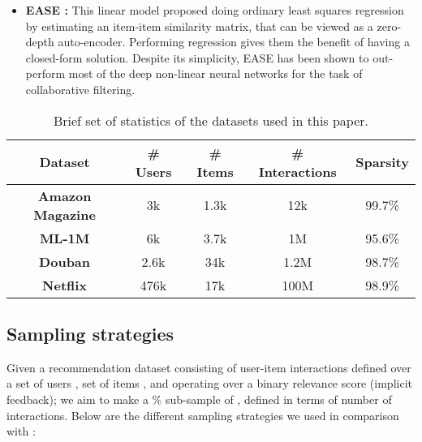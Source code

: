 \documentclass{article}
\begin{document}
\begin{itemize}[leftmargin=.3in]
    \item \textbf{EASE \cite{ease}:} This linear model proposed doing ordinary least squares regression by estimating an item-item similarity matrix, that can be viewed as a zero-depth auto-encoder. Performing regression gives them the benefit of having a closed-form solution. Despite its simplicity, EASE has been shown to out-perform most of the deep non-linear neural networks for the task of collaborative filtering.
\end{itemize}

\begin{table*}\begin{small} \caption{Brief set of statistics of the datasets used in this paper.}
    \label{data_stats}
    \begin{center}
        \begin{tabular}{c | c c c c}
            \toprule
            Dataset & \# Users & \# Items & \# Interactions & Sparsity \\
            
            \midrule
            
\textbf{Amazon Magazine \cite{amz_data}}            & 3k & 1.3k & 12k & 99.7\% \\
            \textbf{ML-1M \cite{movielens}}                      & 6k & 3.7k & 1M & 95.6\% \\
            \textbf{Douban \cite{douban_data}}                     & 2.6k & 34k & 1.2M & 98.7\% \\
\textbf{Netflix \cite{netflix_data}}                    & 476k & 17k & 100M & 98.9\% \\
            
            \bottomrule
        \end{tabular}
    \end{center}
    \end{small}
\end{table*} 
\subsection{Sampling strategies} \label{appendix:samplers}

Given a recommendation dataset  consisting of  user-item interactions defined over a set of users , set of items , and operating over a binary relevance score (implicit feedback); we aim to make a \% sub-sample of , defined in terms of number of interactions. Below are the different sampling strategies we used in comparison with \sampler:
\end{document}

